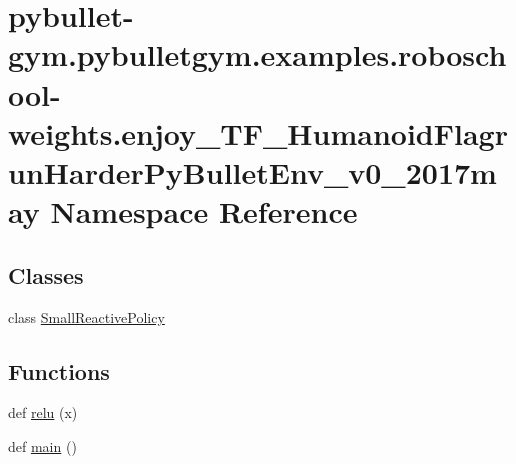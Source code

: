 \hypertarget{namespacepybullet-gym_1_1pybulletgym_1_1examples_1_1roboschool-weights_1_1enjoy___t_f___humanoid6cf5bb1cece630011749e55e6e33a106}{}\section{pybullet-\/gym.pybulletgym.\+examples.\+roboschool-\/weights.enjoy\+\_\+\+T\+F\+\_\+\+Humanoid\+Flagrun\+Harder\+Py\+Bullet\+Env\+\_\+v0\+\_\+2017may Namespace Reference}
\label{namespacepybullet-gym_1_1pybulletgym_1_1examples_1_1roboschool-weights_1_1enjoy___t_f___humanoid6cf5bb1cece630011749e55e6e33a106}
\subsection*{Classes}
\begin{DoxyCompactItemize}
\item 
class \hyperlink{classpybullet-gym_1_1pybulletgym_1_1examples_1_1roboschool-weights_1_1enjoy___t_f___humanoid_flaa0d67c4aa80ca13e2e6ffc09c9234716}{Small\+Reactive\+Policy}
\end{DoxyCompactItemize}
\subsection*{Functions}
\begin{DoxyCompactItemize}
\item 
def \hyperlink{namespacepybullet-gym_1_1pybulletgym_1_1examples_1_1roboschool-weights_1_1enjoy___t_f___humanoid6cf5bb1cece630011749e55e6e33a106_a7f7ac49e3ce40193b3ce894bc7d5310e}{relu} (x)
\item 
def \hyperlink{namespacepybullet-gym_1_1pybulletgym_1_1examples_1_1roboschool-weights_1_1enjoy___t_f___humanoid6cf5bb1cece630011749e55e6e33a106_a0be2740eb119af552483a0969aa76f54}{main} ()
\end{DoxyCompactItemize}
